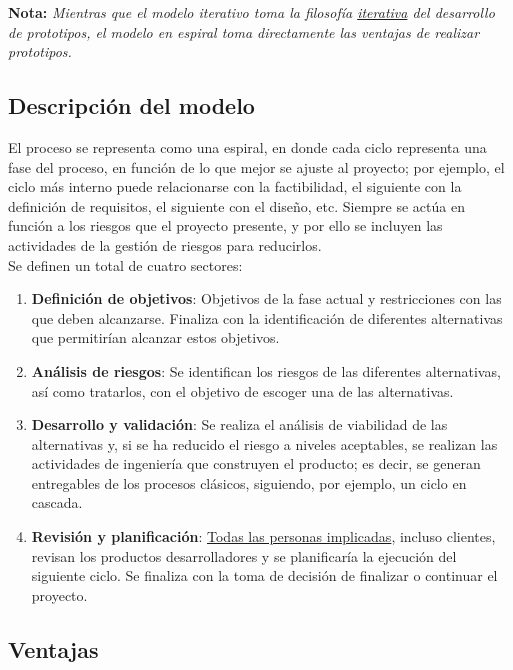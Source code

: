 \textbf{Nota:} \textit{Mientras que el modelo iterativo toma la filosofía \uline{iterativa} del desarrollo de prototipos, el modelo en espiral toma directamente las ventajas de realizar prototipos.}


\subsection{Descripción del modelo}

El proceso se representa como una espiral, en donde cada ciclo representa una fase del proceso, en función de lo que mejor se ajuste al proyecto; por ejemplo, el ciclo más interno puede relacionarse con la factibilidad, el siguiente con la definición de requisitos, el siguiente con el diseño, etc. Siempre se actúa en función a los riesgos que el proyecto presente, y por ello se incluyen las actividades de la gestión de riesgos para reducirlos.\\

Se definen un total de cuatro sectores:

\begin{enumerate}
   \item \textbf{Definición de objetivos}: Objetivos de la fase actual y restricciones con las que deben alcanzarse. Finaliza con la identificación de diferentes alternativas que permitirían alcanzar estos objetivos.
   \item \textbf{Análisis de riesgos}: Se identifican los riesgos de las diferentes alternativas, así como tratarlos, con el objetivo de escoger una de las alternativas.
   \item \textbf{Desarrollo y validación}: Se realiza el análisis de viabilidad de las alternativas y, si se ha reducido el riesgo a niveles aceptables, se realizan las actividades de ingeniería que construyen el producto; es decir, se generan entregables de los procesos clásicos, siguiendo, por ejemplo, un ciclo en cascada.
   \item \textbf{Revisión y planificación}: \uline{Todas las personas implicadas}, incluso clientes, revisan los productos desarrolladores y se planificaría la ejecución del siguiente ciclo. Se finaliza con la toma de decisión de finalizar o continuar el proyecto.
\end{enumerate}


\subsection{Ventajas}

